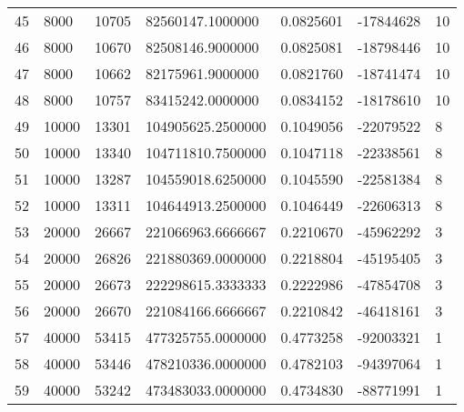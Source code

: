 \begin{longtable}{lllllll}
    45               & 8000           & 10705          & 82560147.1000000   & 0.0825601        & -17844628       & 10                   \\
    46               & 8000           & 10670          & 82508146.9000000   & 0.0825081        & -18798446       & 10                   \\
    47               & 8000           & 10662          & 82175961.9000000   & 0.0821760        & -18741474       & 10                   \\
    48               & 8000           & 10757          & 83415242.0000000   & 0.0834152        & -18178610       & 10                   \\
    49               & 10000          & 13301          & 104905625.2500000  & 0.1049056        & -22079522       & 8                    \\
    50               & 10000          & 13340          & 104711810.7500000  & 0.1047118        & -22338561       & 8                    \\
    51               & 10000          & 13287          & 104559018.6250000  & 0.1045590        & -22581384       & 8                    \\
    52               & 10000          & 13311          & 104644913.2500000  & 0.1046449        & -22606313       & 8                    \\
    53               & 20000          & 26667          & 221066963.6666667  & 0.2210670        & -45962292       & 3                    \\
    54               & 20000          & 26826          & 221880369.0000000  & 0.2218804        & -45195405       & 3                    \\
    55               & 20000          & 26673          & 222298615.3333333  & 0.2222986        & -47854708       & 3                    \\
    56               & 20000          & 26670          & 221084166.6666667  & 0.2210842        & -46418161       & 3                    \\
    57               & 40000          & 53415          & 477325755.0000000  & 0.4773258        & -92003321       & 1                    \\
    58               & 40000          & 53446          & 478210336.0000000  & 0.4782103        & -94397064       & 1                    \\
    59               & 40000          & 53242          & 473483033.0000000  & 0.4734830        & -88771991       & 1                    \\

\end{longtable}
